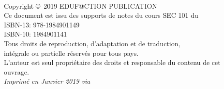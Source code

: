 
\newpage

~\vfill
\thispagestyle{empty}

\noindent Copyright \copyright\ 2019 EDUF@CTION PUBLICATION\\ %

\noindent Ce document est issu des supports de notes du cours SEC 101 du \uCnam \\
ISBN-13: 978-1984901149 \\
ISBN-10: 1984901141 \\
Tous droits de reproduction, d’adaptation et de traduction,\\
intégrale ou partielle réservés pour tous pays.\\
L’auteur est seul propriétaire des droits et responsable du contenu de cet ouvrage.\\

\noindent \textit{Imprimé en Janvier 2019 via \printer} %